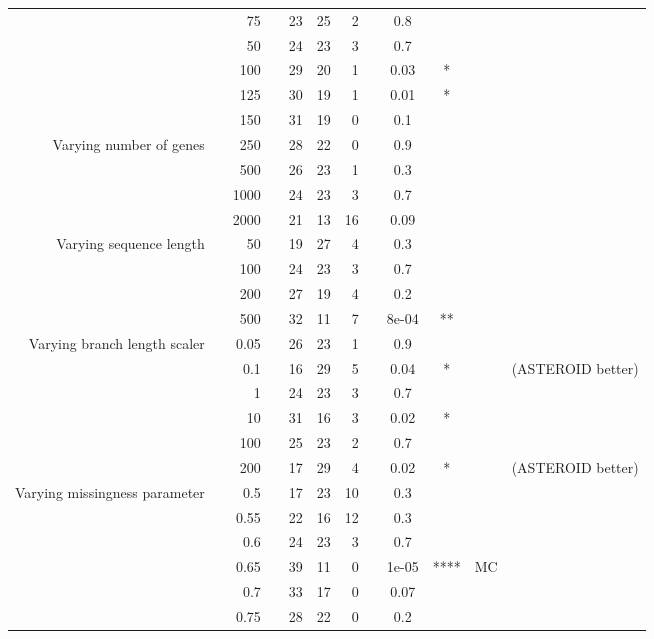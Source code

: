 \begin{table}[!h]
\begin{tabular}{r r r l r r r l c c c l}
& & 75 & & 23 & 25 & 2 & & 0.8 &  &  &  \\
& & 50 & & 24 & 23 & 3 & & 0.7 &  &  &  \\
& & 100 & & 29 & 20 & 1 & & 0.03 & * &  &  \\
& & 125 & & 30 & 19 & 1 & & 0.01 & * &  &  \\
& & 150 & & 31 & 19 & 0 & & 0.1 &  &  &  \\
\midrule
\multirow{ 4}{2cm}{Varying number of genes}
& & 250 & & 28 & 22 & 0 & & 0.9 &  &  &  \\
& & 500 & & 26 & 23 & 1 & & 0.3 &  &  &  \\
& & 1000 & & 24 & 23 & 3 & & 0.7 &  &  &  \\
& & 2000 & & 21 & 13 & 16 & & 0.09 &  &  &  \\
\midrule
\multirow{ 4}{2cm}{Varying sequence length}
& & 50 & & 19 & 27 & 4 & & 0.3 &  &  &  \\
& & 100 & & 24 & 23 & 3 & & 0.7 &  &  &  \\
& & 200 & & 27 & 19 & 4 & & 0.2 &  &  &  \\
& & 500 & & 32 & 11 & 7 & & 8e-04 & ** &  &  \\
\midrule
\multirow{ 6}{2cm}{Varying branch length scaler}
& & 0.05 & & 26 & 23 & 1 & & 0.9 &  &  &  \\
& & 0.1 & & 16 & 29 & 5 & & 0.04 & * &  & (ASTEROID better) \\
& & 1 & & 24 & 23 & 3 & & 0.7 &  &  &  \\
& & 10 & & 31 & 16 & 3 & & 0.02 & * &  &  \\
& & 100 & & 25 & 23 & 2 & & 0.7 &  &  &  \\
& & 200 & & 17 & 29 & 4 & & 0.02 & * &  & (ASTEROID better) \\
\midrule
\multirow{ 6}{2cm}{Varying missingness parameter}
& & 0.5 & & 17 & 23 & 10 & & 0.3 &  &  &  \\
& & 0.55 & & 22 & 16 & 12 & & 0.3 &  &  &  \\
& & 0.6 & & 24 & 23 & 3 & & 0.7 &  &  &  \\
& & 0.65 & & 39 & 11 & 0 & & 1e-05 & **** & MC &  \\
& & 0.7 & & 33 & 17 & 0 & & 0.07 &  &  &  \\
& & 0.75 & & 28 & 22 & 0 & & 0.2 &  &  &  \\
\bottomrule
\end{tabular}
\end{table}

